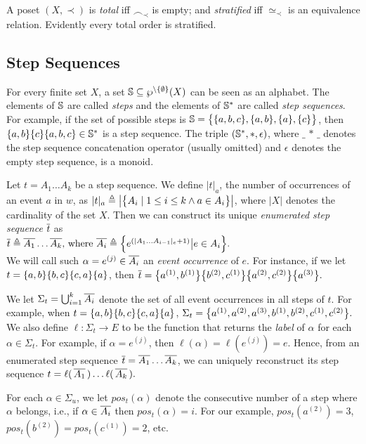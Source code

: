 \documentclass{llncs}
\begin{document}
A poset $(X,\prec)$ is {\em total} iff $\frown_\prec$ is empty; and {\em stratified} iff $\simeq_\prec$ is an equivalence relation. Evidently every total order is stratified.


\subsection{Step Sequences\label{sec:steps}}
For every finite set $X$, a set $\mathbb{S} \subseteq \wp^{\setminus \{\emptyset\}}(X)$ can be seen as an alphabet. 
The elements of $\mathbb{S}$ are called {\em steps} and
the elements of $\mathbb{S}^*$ are called {\em step sequences}. For example, if the set of possible steps is 
$\mathbb{S} = \bigl\{ \{a,b,c\}, \{a,b\}, \{a\}, \{c\} \bigr\}$, then
$\{a,b\}\{c\}\{a,b,c\} \in \mathbb{S}^*$ is a step sequence.
The triple $(\mathbb{S}^*,\ast,\epsilon)$, where $\_\,\ast\,\_$ denotes the step sequence concatenation operator (usually omitted) and $\epsilon$ denotes the empty step sequence, is a monoid.

Let $t=A_1\ldots A_k$ be a step sequence. We define  $|t|_a$, the number of occurrences of an event $a$ in $w$, as $|t|_a \triangleq \bigl\lvert\bigl\{A_i\mid 1\le i \le k \wedge a\in A_i\bigr\}\bigr\rvert$, where $|X|$ denotes the cardinality of the set $X$.  
Then we can construct its unique \emph{enumerated step sequence} $\overline{t}$ as\\
\mbox{\hspace{2.5cm}}$\overline{t}\triangleq \overline{A_1}\ldots \overline{A_k}\text{, where } \overline{A_i} \triangleq \Bigl\{e^{(|A_1\ldots A_{i-1}|_e+1)}\bigl\lvert e\in A_i\bigr.\Bigr\}.$\\
We will call such $\alpha=e^{(j)}\in \overline{A_i} $ an \emph{event occurrence} of $e$. For instance, if we let  $t= \{a,b\}\{b,c\}\{c,a\}\{a\}$,
then  $\overline{t}=\bigl\{a^{(1)},b^{(1)}\bigr\}\bigl\{b^{(2)},c^{(1)}\bigr\}\bigl\{a^{(2)},c^{(2)}\bigr\}\bigl\{a^{(3)}\bigr\}.$ 

We let $\Sigma_t=\bigcup_{i=1}^k \overline{A_i}$ denote the set of all event occurrences in all steps of $t$. For example, when
$t= \{a,b\}\{b,c\}\{c,a\}\{a\}$, $\Sigma_t=\bigl\{ a^{(1)},a^{(2)},a^{(3)}, b^{(1)}, b^{(2)},
c^{(1)},c^{(2)} \bigr\}.$ We also define $\ell:\Sigma_t\rightarrow E$ to be the function that returns the \emph{label} of $\alpha$ for each $\alpha \in \Sigma_t$. For example, if $\alpha=e^{(j)}$, then $\ell(\alpha)=\ell(e^{(j)})=e$. Hence, from an enumerated step sequence $\overline{t} = \overline{A_1}\ldots \overline{A_k}$, we can uniquely reconstruct its step sequence $t =  \ell(\,\overline{A_1}\,)\ldots \ell(\,\overline{A_k}\,).$


For each $\alpha \in \Sigma_u$, we let $pos_t(\alpha)$ denote the consecutive number of a step where $\alpha$ belongs, i.e., if $\alpha\in \overline{A_i}$ then $pos_t(\alpha)=i$. For our example, $pos_t(a^{(2)})=3$,  $pos_t(b^{(2)})=pos_t(c^{(1)})=2$, etc.
\end{document}
